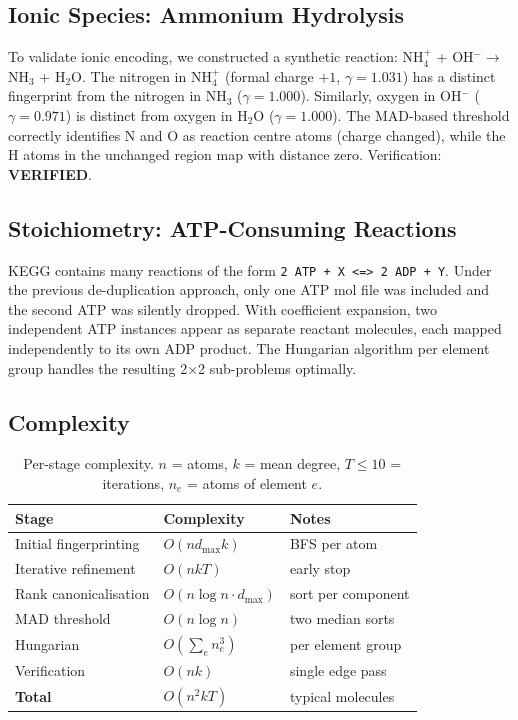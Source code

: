 \documentclass[12pt,a4paper]{article}
\begin{document}
\subsection{Ionic Species: Ammonium Hydrolysis}

To validate ionic encoding, we constructed a synthetic reaction:
NH$_4^+$ + OH$^- \to$ NH$_3$ + H$_2$O. The nitrogen in NH$_4^+$
(formal charge $+1$, $\gamma = 1.031$) has a distinct fingerprint
from the nitrogen in NH$_3$ ($\gamma = 1.000$). Similarly,
oxygen in OH$^-$ ($\gamma = 0.971$) is distinct from oxygen in
H$_2$O ($\gamma = 1.000$). The MAD-based threshold correctly
identifies N and O as reaction centre atoms (charge changed),
while the H atoms in the unchanged region map with distance zero.
Verification: \textbf{VERIFIED}.

\subsection{Stoichiometry: ATP-Consuming Reactions}

KEGG contains many reactions of the form
\texttt{2 ATP + X <=> 2 ADP + Y}. Under the previous de-duplication
approach, only one ATP mol file was included and the second ATP was
silently dropped. With coefficient expansion, two independent ATP
instances appear as separate reactant molecules, each mapped
independently to its own ADP product. The Hungarian algorithm per
element group handles the resulting 2$\times$2 sub-problems optimally.

\subsection{Complexity}

\begin{table}[h]
\centering
\caption{Per-stage complexity. $n$ = atoms, $k$ = mean degree,
$T \leq 10$ = iterations, $n_e$ = atoms of element $e$.}
\label{tab:complexity}
\begin{tabular}{lll}
\toprule
Stage & Complexity & Notes \\
\midrule
Initial fingerprinting & $O(n d_{\max} k)$ & BFS per atom \\
Iterative refinement   & $O(n k T)$        & early stop \\
Rank canonicalisation  & $O(n \log n \cdot d_{\max})$ & sort per component \\
MAD threshold          & $O(n \log n)$     & two median sorts \\
Hungarian              & $O(\sum_e n_e^3)$ & per element group \\
Verification           & $O(n k)$          & single edge pass \\
\textbf{Total}         & $O(n^2 k T)$      & typical molecules \\
\bottomrule
\end{tabular}
\end{table}
\end{document}
